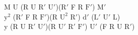 M U (R U $\text{R}'$ $\text{U}'$)($\text{R}'$ F R $\text{F}'$) $\text{M}'$\\
$\text{y}^2$ ($\text{R}'$ F R $\text{F}'$)(R $\text{U}^2$ $\text{R}'$) $\text{d}'$ ($\text{L}'$ $\text{U}'$ L)\\
y (R U $\text{R}'$ $\text{U}'$)(R $\text{U}'$ $\text{R}'$ $\text{F}'$) $\text{U}'$ (F R U $\text{R}'$)\\
